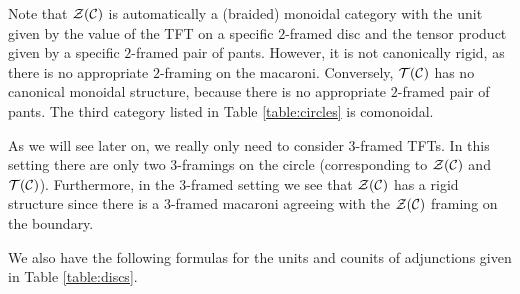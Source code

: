 \documentclass{amsart}
\begin{document}
\begin{remark}
Note that $\mathcal Z(\mathcal C)$ is automatically a (braided) monoidal category with the unit given by the value of the TFT on a specific $2$-framed disc and the tensor product given by a specific $2$-framed pair of pants.  However, it is not canonically rigid, as there is no appropriate $2$-framing on the macaroni.  Conversely, $\mathcal T(\mathcal C)$ has no canonical monoidal structure, because there is no appropriate $2$-framed pair of pants.  The third category listed in Table \ref{table:circles} is comonoidal.

As we will see later on, we really only need to consider $3$-framed TFTs.  In this setting there are only two $3$-framings on the circle (corresponding to $\mathcal Z(\mathcal C)$ and $\mathcal T(\mathcal C)$).  Furthermore, in the $3$-framed setting we see that $\mathcal Z(\mathcal C)$ has a rigid structure since there is a $3$-framed macaroni agreeing with the $\mathcal Z(\mathcal C)$ framing on the boundary.
\end{remark}

We also have the following formulas for the units and counits of adjunctions given in Table \ref{table:discs}.
\end{document}

